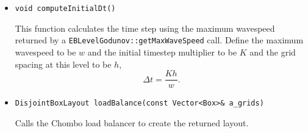 \begin{itemize}
\item \begin{small} \begin{verbatim}
void computeInitialDt()
\end{verbatim}\end{small}
This  function calculates the time step using 
the maximum wavespeed returned by a 
\verb/EBLevelGodunov::getMaxWaveSpeed/ call.
Define the maximum wavespeed to be $w$ and the
initial timestep multiplier to be $K$ and the
grid spacing at this level to be $h$,
\begin{equation}
\Delta t= \frac{K h}{w}.
\end{equation}

\item \begin{small} \begin{verbatim}
DisjointBoxLayout loadBalance(const Vector<Box>& a_grids)
\end{verbatim}\end{small}
Calls the Chombo load balancer to create the returned layout.
\end{itemize}

